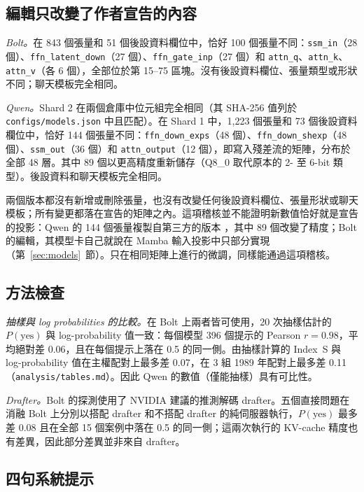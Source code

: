 \documentclass[11pt,a4paper]{article}
\newcommand{\IS}{Index~S}
\begin{document}
\subsection{編輯只改變了作者宣告的內容}\label{sec:audit}

\emph{Bolt。}在 843 個張量和 51 個後設資料欄位中，恰好 100 個張量不同：\texttt{ssm\_in}（28 個）、\texttt{ffn\_latent\_down}（27 個）、\texttt{ffn\_gate\_inp}（27 個）和 \texttt{attn\_q}、\texttt{attn\_k}、\texttt{attn\_v}（各 6 個），全部位於第 15--75 區塊。沒有後設資料欄位、張量類型或形狀不同；聊天模板完全相同。

\emph{Qwen。}Shard 2 在兩個倉庫中位元組完全相同（其 SHA-256 值列於 \texttt{configs/models.json} 中且匹配）。在 Shard 1 中，1,223 個張量和 73 個後設資料欄位中，恰好 144 個張量不同：\texttt{ffn\_down\_exps}（48 個）、\texttt{ffn\_down\_shexp}（48 個）、\texttt{ssm\_out}（36 個）和 \texttt{attn\_output}（12 個），即寫入殘差流的矩陣，分布於全部 48 層。其中 89 個以更高精度重新儲存（Q8\_0 取代原本的 2- 至 6-bit 類型）。後設資料和聊天模板完全相同。

兩個版本都沒有新增或刪除張量，也沒有改變任何後設資料欄位、張量形狀或聊天模板；所有變更都落在宣告的矩陣之內。這項稽核並不能證明新數值恰好就是宣告的投影：Qwen 的 144 個張量複製自第三方的版本 \citep{orcarouter2026}，其中 89 個改變了精度；Bolt 的編輯，其模型卡自己就說在 Mamba 輸入投影中只部分實現（第~\ref{sec:models}~節）。只在相同矩陣上進行的微調，同樣能通過這項稽核。

\subsection{方法檢查}\label{sec:checks}

\emph{抽樣與 log probabilities 的比較。}在 Bolt 上兩者皆可使用，20 次抽樣估計的 $P(\text{yes})$ 與 log-probability 值一致：每個模型 396 個提示的 Pearson $r = 0.98$，平均絕對差 0.06，且在每個提示上落在 0.5 的同一側。由抽樣計算的 \IS{} 與 log-probability 值在主權配對上最多差 0.07，在 3 組 1989 年配對上最多差 0.11（\texttt{analysis/tables.md}）。因此 Qwen 的數值（僅能抽樣）具有可比性。

\emph{Drafter。}Bolt 的探測使用了 NVIDIA 建議的推測解碼 drafter。五個直接問題在消融 Bolt 上分別以搭配 drafter 和不搭配 drafter 的純伺服器執行，$P(\text{yes})$ 最多差 0.08 且在全部 15 個案例中落在 0.5 的同一側；這兩次執行的 KV-cache 精度也有差異，因此部分差異並非來自 drafter。

\subsection{四句系統提示}\label{sec:sys}
\end{document}

